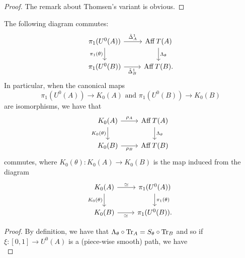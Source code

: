 \documentclass[12pt]{amsart}
\begin{document}
\begin{prop}
\begin{proof}
The remark about Thomsen's variant is obvious. 
\end{proof}
\end{prop}

\begin{cor}\label{cor:pairing}
The following diagram commutes:
\begin{equation}\label{eq:cor:pairing-diagram1}
\begin{tikzcd}
\pi_1(U^0(A)) \arrow[d, "\pi_1(\theta)"'] \arrow[r, "\tD_A^1"] & \Aff T(A) \arrow[d, "\Lambda_\theta"] \\
\pi_1(U^0(B)) \arrow[r, "\tD_B^1"']                            & \Aff T(B).                            
\end{tikzcd} 
\end{equation}
In particular, when the canonical maps
\begin{equation}
\pi_1(U^0(A)) \to K_0(A) \text{ and }\pi_1(U^0(B)) \to K_0(B)
\end{equation}
 are isomorphisms, we have that
\begin{equation}
\begin{tikzcd}
K_0(A) \arrow[d, "K_0(\theta)"'] \arrow[r, "\rho_A"] & \Aff T(A) \arrow[d, "\Lambda_\theta"] \\
K_0(B) \arrow[r, "\rho_B"']                            & \Aff T(B)                              
\end{tikzcd} 
\end{equation}
commutes, where $K_0(\theta): K_0(A) \to K_0(B)$ is the map induced from the diagram
\begin{equation}
\begin{tikzcd}
K_0(A) \arrow[r, "\simeq"] \arrow[d, "K_0(\theta)"'] & \pi_1(U^0(A)) \arrow[d, "\pi_1(\theta)"] \\
K_0(B) \arrow[r, "\simeq"']                          & \pi_1(U^0(B)).                         
\end{tikzcd}
\end{equation}
\begin{proof}
By definition, we have that $\Lambda_\theta \circ \text{Tr}_A = S_\theta \circ \text{Tr}_B$ and so if $\xi: [0,1] \to U^0(A)$ is a (piece-wise smooth) path, we have
\begin{equation}\label{eq:lambda-S-commutes-with-Tr}

\end{equation}
\end{proof}
\end{cor}
\end{document}
